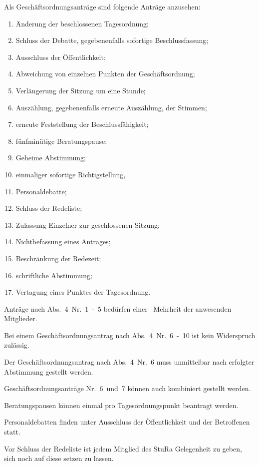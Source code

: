 \begin{multicols}{2}
\Abs \Satz Als Geschäftsordnungsanträge sind folgende Anträge anzusehen:
\begin{enumerate}
\item Änderung der beschlossenen Tagesordnung;
\item Schluss der Debatte, gegebenenfalls sofortige Beschlussfassung;
\item Ausschluss der Öffentlichkeit;
\item Abweichung von einzelnen Punkten der Geschäftsordnung;
\item Verlängerung der Sitzung um eine Stunde;
\item Auszählung, gegebenenfalls erneute Auszählung, der Stimmen;
\item erneute Feststellung der Beschlussfähigkeit;
\item fünfminütige Beratungspause;
\item Geheime Abstimmung;
\item einmaliger sofortige Richtigstellung,
\item Personaldebatte;
\item Schluss der Redeliste;
\item Zulassung Einzelner zur geschlossenen Sitzung;
\item Nichtbefassung eines Antrages;
\item Beschränkung der Redezeit;
\item schriftliche Abstimmung;
\item Vertagung eines Punktes der Tagesordnung.
\end{enumerate}

\Abs \Satz Anträge nach Abs.~4~Nr.~1~-~5 bedürfen einer ~Mehrheit der anwesenden Mitglieder.

\Abs \Satz Bei einem Geschäftsordnungsantrag nach Abs.~4~Nr.~6~-~10 ist kein Widerspruch zulässig.

\Abs \Satz Der Geschäftsordnungsantrag nach Abs.~4~Nr.~6 muss unmittelbar nach erfolgter Abstimmung gestellt werden.

\Abs \Satz Geschäftsordnungsanträge Nr.~6~und~7 können auch kombiniert gestellt werden.

\Abs \Satz Beratungspausen können einmal pro Tagesordnungspunkt beantragt werden.

\Abs \Satz Personaldebatten finden unter Ausschluss der Öffentlichkeit und der Betroffenen statt.

\Abs \Satz Vor Schluss der Redeliste ist jedem Mitglied des StuRa Gelegenheit zu geben, sich noch auf diese setzen zu lassen.


\end{multicols}
